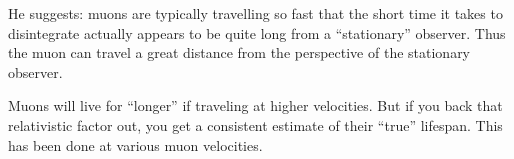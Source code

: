 \begin{enumerate}
  He suggests: muons are typically travelling so fast that the short
  time it takes to disintegrate actually appears to be quite long from a
  ``stationary'' observer. Thus the muon can travel a great distance
  from the perspective of the stationary observer.

  Muons will live for ``longer'' if traveling at higher velocities. But
  if you back that relativistic factor out, you get a consistent
  estimate of their ``true'' lifespan. This has been done at various
  muon velocities.

\end{enumerate}
